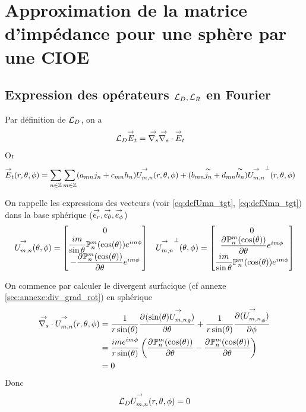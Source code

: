 \section{Approximation de la matrice d'impédance pour une sphère par une CIOE}

  \subsection[Expression des opérateurs LD,LR en Fourier]{Expression des opérateurs \(\LD,\LR\) en Fourier}

    Par définition de \(\LD\), on a
    \begin{align}
      \LD \vE_t & = \vgrads{} \vdivs{} \vE_t
    \end{align}
    Or 
    \begin{align*}
      \vE_t(\rtp) &= \sum_{n\in\ZZ}\sum_{m\in\ZZ} (a_{mn} j_n + c_{mn}h_n) \Umn(\rtp) + (b_{mn} \tilde{j_n}+d_{mn} \tilde{h_n}) \Umn^\perp(\rtp)
    \end{align*}

    On rappelle  les expressions des vecteurs (voir \eqref{eq:defUmn_tgt}, \eqref{eq:defNmn_tgt}) dans la base sphérique (\(\vect{e_r},\vect{e_\theta},\vect{e_\phi}\))
    \begin{align*}
      \Umn(\tp) =
      \begin{bmatrix}
          0
          \\
          \frac{im}{\sin\theta}\Pmn(\cos(\theta))e^{im\phi}
          \\
          - \ddr{\theta}{\Pmn(\cos(\theta))}e^{im\phi}
      \end{bmatrix}
      &&
      \Umn^\perp(\tp) =
      \begin{bmatrix}
        0
        \\
        \ddr{\theta}{\Pmn(\cos(\theta))}e^{im\phi}
        \\
        \frac{im}{\sin\theta}\Pmn(\cos(\theta))e^{im\phi}
      \end{bmatrix}
    \end{align*}

    On commence par calculer le divergent surfacique (cf annexe \ref{sec:annexe:div_grad_rot}) en sphérique
    \begin{align*}
      \vdivs{}\Umn(\rtp) &= \frac{1}{r\sin(\theta)} \ddr{\theta}{(\sin(\theta)\Umn_\theta)} + \frac{1}{r\sin(\theta)}\ddr{\phi}{(\Umn_\phi)}
      \\
      &=\frac{ime^{im\phi}}{r\sin(\theta)}\left( \ddr{\theta}{\Pmn(\cos(\theta))} - \ddr{\theta}{\Pmn(\cos(\theta))} \right)
      \\
      &= 0
    \end{align*}
    Donc 
    \begin{align*}
      \LD\Umn(\rtp) = 0
    \end{align*}

